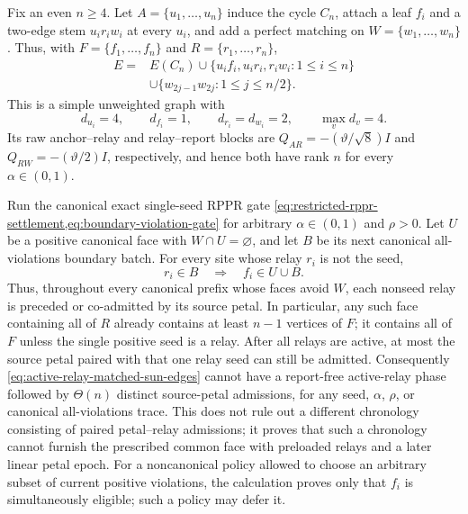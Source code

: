 \begin{proposition}
\label{prop:active-relay-matched-sun-preload-obstruction}
Fix an even $n\geq4$.  Let $A=\{u_1,\ldots,u_n\}$ induce the cycle
$C_n$, attach a leaf $f_i$ and a two-edge stem $u_i r_i w_i$ at every
$u_i$, and add a perfect matching on $W=\{w_1,\ldots,w_n\}$.  Thus, with
$F=\{f_1,\ldots,f_n\}$ and $R=\{r_1,\ldots,r_n\}$,
\begin{equation}
 \begin{split}
 E={}&E(C_n)\cup\{u_if_i,u_ir_i,r_iw_i:1\leq i\leq n\}\\
    &\cup\{w_{2j-1}w_{2j}:1\leq j\leq n/2\}.
 \end{split}
 \label{eq:active-relay-matched-sun-edges}
\end{equation}
This is a simple unweighted graph with
\begin{equation*}
 d_{u_i}=4,\qquad d_{f_i}=1,\qquad d_{r_i}=d_{w_i}=2,
 \qquad \max_v d_v=4.
\end{equation*}
Its raw anchor--relay and relay--report blocks are
$Q_{AR}=-(\vartheta/\sqrt8)I$ and $Q_{RW}=-(\vartheta/2)I$, respectively,
and hence both have rank $n$ for every $\alpha\in(0,1)$.

Run the canonical exact single-seed RPPR gate
\cref{eq:restricted-rppr-settlement,eq:boundary-violation-gate} for arbitrary
$\alpha\in(0,1)$ and $\rho>0$.  Let $U$ be a positive canonical face with
$W\cap U=\varnothing$, and let $B$ be its next canonical all-violations
boundary batch.
For every site whose relay $r_i$ is not the seed,
\begin{equation}
 r_i\in B\quad\Longrightarrow\quad f_i\in U\cup B.
 \label{eq:active-relay-petal-precedence}
\end{equation}
Thus, throughout every canonical prefix whose faces avoid $W$, each nonseed
relay is preceded or co-admitted by its source petal.  In particular, any
such face containing all of $R$ already contains at least $n-1$ vertices of
$F$; it contains all of $F$ unless the single positive seed is a relay.
After all relays are active, at most the source petal paired with that one
relay seed can still be admitted.  Consequently
\cref{eq:active-relay-matched-sun-edges} cannot have a report-free active-relay
phase followed by $\Theta(n)$ distinct source-petal admissions, for any seed,
$\alpha$, $\rho$, or canonical all-violations trace.
This does not rule out a different chronology consisting of paired
petal--relay admissions; it proves that such a chronology cannot furnish the
prescribed common face with preloaded relays and a later linear petal epoch.
For a noncanonical policy allowed to choose an arbitrary subset of current
positive violations, the calculation proves only that $f_i$ is simultaneously
eligible; such a policy may defer it.
\end{proposition}

